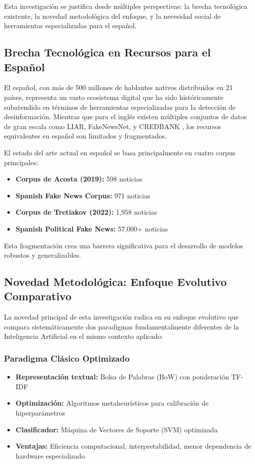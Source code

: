 Esta investigación se justifica desde múltiples perspectivas: la brecha tecnológica existente, la novedad metodológica del enfoque, y la necesidad social de herramientas especializadas para el español.

\subsection{Brecha Tecnológica en Recursos para el Español}

El español, con más de 500 millones de hablantes nativos distribuidos en 21 países, representa un vasto ecosistema digital que ha sido históricamente subatendido en términos de herramientas especializadas para la detección de desinformación. Mientras que para el inglés existen múltiples conjuntos de datos de gran escala como LIAR, FakeNewsNet, y CREDBANK \cite{hu2022deep}, los recursos equivalentes en español son limitados y fragmentados.

El estado del arte actual en español se basa principalmente en cuatro corpus principales:
\begin{itemize}
    \item \textbf{Corpus de Acosta (2019):} 598 noticias \cite{acosta2019construccion}
    \item \textbf{Spanish Fake News Corpus:} 971 noticias \cite{posadas2019detection}
    \item \textbf{Corpus de Tretiakov (2022):} 1,958 noticias \cite{tretiakov2022detection}
    \item \textbf{Spanish Political Fake News:} 57,000+ noticias \cite{blanco2024enhancing}
\end{itemize}

Esta fragmentación crea una barrera significativa para el desarrollo de modelos robustos y generalizables.

\subsection{Novedad Metodológica: Enfoque Evolutivo Comparativo}

La novedad principal de esta investigación radica en su enfoque evolutivo que compara sistemáticamente dos paradigmas fundamentalmente diferentes de la Inteligencia Artificial en el mismo contexto aplicado:

\subsubsection{Paradigma Clásico Optimizado}
\begin{itemize}
    \item \textbf{Representación textual:} Bolsa de Palabras (BoW) con ponderación TF-IDF
    \item \textbf{Optimización:} Algoritmos metaheurísticos para calibración de hiperparámetros
    \item \textbf{Clasificador:} Máquina de Vectores de Soporte (SVM) optimizada
    \item \textbf{Ventajas:} Eficiencia computacional, interpretabilidad, menor dependencia de hardware especializado
\end{itemize}

